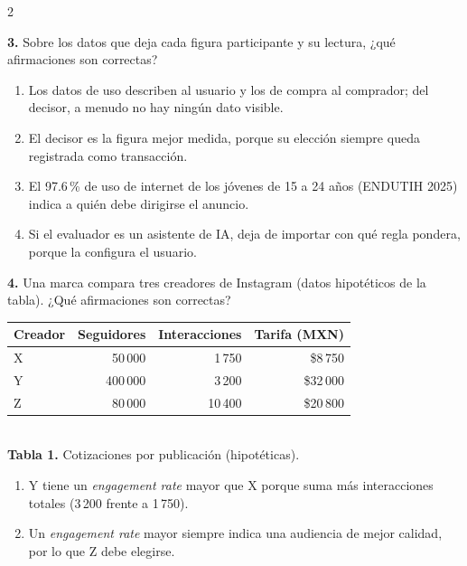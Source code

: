 \documentclass[10pt,letterpaper]{article}
\newcommand{\cas}{\framebox[1.0em]{\rule{0pt}{1.05ex}}}
\begin{document}
\begin{multicols}{2}
\begin{minipage}[t]{\columnwidth}\noindent\textbf{3.} Sobre los datos que deja cada figura participante y su lectura, ¿qué afirmaciones son correctas?
\vspace{1pt}\begin{enumerate}[label=\cas\ \alph*),leftmargin=2.3em,itemsep=1.2pt,topsep=1pt,parsep=0pt,partopsep=0pt]
\item Los datos de uso describen al usuario y los de compra al comprador; del decisor, a menudo no hay ningún dato visible.
\item El decisor es la figura mejor medida, porque su elección siempre queda registrada como transacción.
\item El 97.6\,\% de uso de internet de los jóvenes de 15 a 24 años (ENDUTIH 2025) indica a quién debe dirigirse el anuncio.
\item Si el evaluador es un asistente de IA, deja de importar con qué regla pondera, porque la configura el usuario.
\end{enumerate}\end{minipage}\par\vspace{3pt}
\begin{minipage}[t]{\columnwidth}\noindent\textbf{4.} Una marca compara tres creadores de Instagram (datos hipotéticos de la tabla). ¿Qué afirmaciones son correctas?
\begin{center}{\scriptsize\renewcommand{\arraystretch}{1.05}\begin{tabular}{@{}lrrr@{}}\toprule
Creador & Seguidores & Interacciones & Tarifa (MXN)\\\midrule
X & 50\,000 & 1\,750 & \$8\,750\\ Y & 400\,000 & 3\,200 & \$32\,000\\ Z & 80\,000 & 10\,400 & \$20\,800\\\bottomrule\end{tabular}}\\[1pt]{\tiny\textbf{Tabla 1.} Cotizaciones por publicación (hipotéticas).}\end{center}
\vspace{1pt}\begin{enumerate}[label=\cas\ \alph*),leftmargin=2.3em,itemsep=1.2pt,topsep=1pt,parsep=0pt,partopsep=0pt]
\item Y tiene un \textit{engagement rate} mayor que X porque suma más interacciones totales (3\,200 frente a 1\,750).
\item Un \textit{engagement rate} mayor siempre indica una audiencia de mejor calidad, por lo que Z debe elegirse.

\end{enumerate}
\end{minipage}
\end{multicols}
\end{document}
